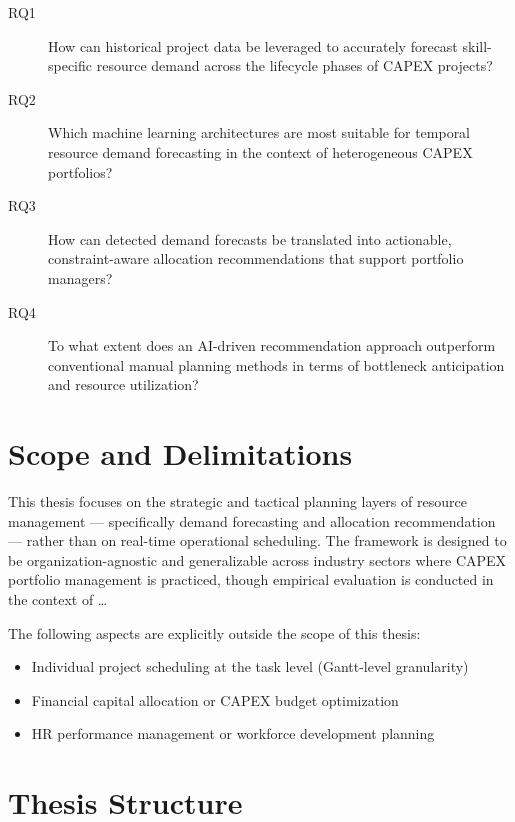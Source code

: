 \begin{description}
  \item[RQ1] How can historical project data be leveraged to accurately forecast skill-specific resource demand across the lifecycle phases of CAPEX projects?

  \item[RQ2] Which machine learning architectures are most suitable for temporal resource demand forecasting in the context of heterogeneous CAPEX portfolios?

  \item[RQ3] How can detected demand forecasts be translated into actionable, constraint-aware allocation recommendations that support portfolio managers?

  \item[RQ4] To what extent does an AI-driven recommendation approach outperform conventional manual planning methods in terms of bottleneck anticipation and resource utilization?
\end{description}

\section{Scope and Delimitations}
\label{sec:scope}

This thesis focuses on the strategic and tactical planning layers of resource management — specifically demand forecasting and allocation recommendation — rather than on real-time operational scheduling. The framework is designed to be organization-agnostic and generalizable across industry sectors where CAPEX portfolio management is practiced, though empirical evaluation is conducted in the context of \ldots %

The following aspects are explicitly outside the scope of this thesis:
\begin{itemize}
  \item Individual project scheduling at the task level (Gantt-level granularity)
  \item Financial capital allocation or CAPEX budget optimization
  \item HR performance management or workforce development planning
\end{itemize}

\section{Thesis Structure}
\label{sec:thesis_structure}


